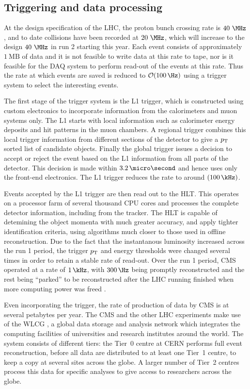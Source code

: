 \subsection{Triggering and data processing}
\label{sec:trigger}

At the design specification of the LHC, the proton bunch crossing rate is
$40~\MHz$, and to date collisions have been recorded at $20~\MHz$, which will
increase to the design $40~\MHz$ in run 2 starting this year. Each event
consists of approximately $1~\text{MB}$ of data and it is not feasible to write
data at this rate to tape, nor is it feasible for the \ac{DAQ} system to perform
read-out of the events at this rate. Thus the rate at which events are saved is
reduced to $\mathcal{O}(100\,\Hz)$ using a trigger system to select the
interesting events.

The first stage of the trigger system is the \ac{L1} trigger, which is
constructed using custom electronics to incorporate information from the
calorimeters and muon systems only. The \ac{L1} starts with local information
such as calorimeter energy deposits and hit patterns in the muon chambers. A
regional trigger combines this local trigger information from different sections
of the detector to give a $p_{\mathrm{T}}$ sorted list of candidate objects. Finally the
global trigger issues a decision to accept or reject the event based on the
\ac{L1} information from all parts of the detector. This decision is made within
$3.2\,\micro\second$ and hence uses only the front-end electronics. The \ac{L1}
trigger reduces the rate to around $(100\,\kHz)$.  

Events accepted by the \ac{L1} trigger are then read out to the \ac{HLT}. This
operates on a processor farm of several thousand CPU cores and processes the 
complete detector information, including from the tracker. The \ac{HLT}
is capable of detemining the object momenta with much greater accuracy, and
apply tighter identification criteria, using algorithms much closer to those
used in offline reconstruction. Due to the fact that the instantanous luminosity
increased across the run 1 period, the trigger $p_{\mathrm{T}}$ and energy thresholds were
changed several times in order to retain a stable rate of read-out. Over the run
1 period, CMS operated at a rate of $1\,\kHz$, with $300\,\Hz$ being promptly
reconstructed and the rest being ``parked'' to be reconstructed after the LHC running
finished when more computing power was freed \cite{CMS:2012ooa}.

Even incorporating the trigger, the rate of production of data by CMS is at
several petabytes per year. The CMS and the other LHC experiments make use of
the \ac{WLCG} \cite{web:grid}, a global data storage and analysis network which
integrates the computing facilities of universities and research institutes
around the world. The system consists of different tiers: the Tier~0 centre at
CERN performs full event reconstruction, before all data are distributed to at
least one Tier~1 centre, to keep a copy at several sites across the globe. A
larger number of Tier~2 centres process this data for specific analyses to give
access to researchers across the globe. 

